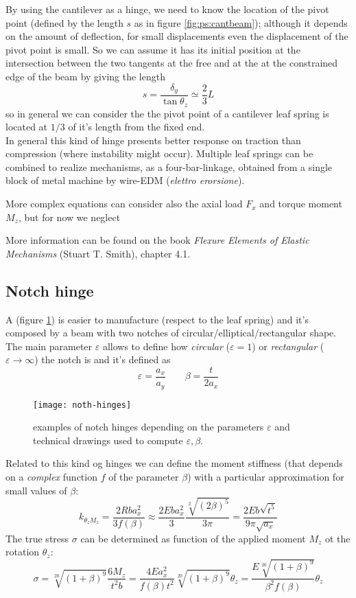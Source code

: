 	By using the cantilever as a hinge, we need to know the location of the pivot point (defined by the length $s$ as in figure \ref{fig:ps:cantbeam}); although it depends on the amount of deflection, for small displacements even the displacement of the pivot point is small. So we can assume it has its initial position at the intersection between the two tangents at the free and at the at the constrained edge of the beam by giving the length
	\[ s = \frac{\delta_y}{\tan\theta_z} \simeq \frac 2 3 L \]
	so in general we can consider the the pivot point of a cantilever leaf spring is located at $1/3$ of it's length from the fixed end. \\
	In general this kind of hinge presents better response on traction than compression (where instability might occur). Multiple leaf springs can be combined to realize mechanisms, as a four-bar-linkage, obtained from a single block of metal machine by wire-EDM (\textit{elettro erorsione}).
	
	More complex equations can consider also the axial load $F_x$ and torque moment $M_z$, but for now we neglect
	\begin{note}
		More information can be found on the book \textit{Flexure Elements of Elastic Mechanisms} (Stuart T. Smith), chapter 4.1.
	\end{note}

	\subsection{Notch hinge}
		A  (figure \ref{fig:ps:notch-hinges}) is easier to manufacture (respect to the leaf spring) and it's composed by a beam with two notches of circular/elliptical/rectangular shape. The main parameter $\varepsilon$ allows to define how \textit{circular} ($\varepsilon = 1$) or \textit{rectangular} ($\varepsilon\rightarrow \infty$) the notch is and it's defined as
		\begin{equation}
			\varepsilon = \frac{a_x}{a_y} \qquad \beta = \frac{t}{2a_x}
		\end{equation}
	
		\begin{figure}[bht]
			\centering
			\texttt{[image: noth-hinges]}
			\caption{examples of notch hinges depending on the parameters $\varepsilon$ and technical drawings used to compute $\varepsilon,\beta$.}
			\label{fig:ps:notch-hinges}
		\end{figure}
	
		Related to this kind og hinges we can define the moment stiffness (that depends on a \textit{complex} function $f$ of the parameter $\beta$) with a particular approximation for small values of $\beta$:
		\[ k_{\theta_zM_z} = \frac{2Rb a_x^2}{3f(\beta)} \approx \frac{2Eba_x^2}{3} \frac{\sqrt[2]{(2\beta)^5}}{3\pi} = \frac{2Eb \sqrt {t^5}}{9\pi \sqrt{a_x}} \]
		The true  stress $\sigma$ can be determined as function of the applied moment $M_z$ ot the rotation $\theta_z$:
		\[ \sigma = \sqrt[20]{(1+\beta)^9} \frac{6M_z}{t^2b} = \frac{4 E a_x^2 }{f(\beta)t^2}\sqrt[20]{(1+\beta)^9} \theta_z = \frac{ E \sqrt[20]{(1+\beta)^9}}{\beta^2 f(\beta)} \theta_z \]
		

